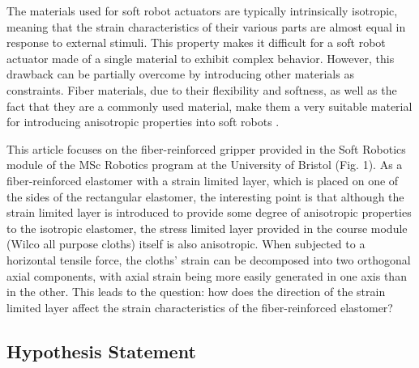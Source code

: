 \documentclass[conference]{IEEEtran}
\begin{document}
The materials used for soft robot actuators are typically intrinsically isotropic, meaning that the strain characteristics of their various parts are almost equal in response to external stimuli. This property makes it difficult for a soft robot actuator made of a single material to exhibit complex behavior. However, this drawback can be partially overcome by introducing other materials as constraints. Fiber materials, due to their flexibility and softness, as well as the fact that they are a commonly used material, make them a very suitable material for introducing anisotropic properties into soft robots \cite{overview}.



This article focuses on the fiber-reinforced gripper provided in the Soft Robotics module of the MSc Robotics program at the University of Bristol (Fig. 1). As a fiber-reinforced elastomer with a strain limited layer\cite{stress_constraint_layer}, which is placed on one of the sides of the rectangular elastomer, the interesting point is that although the strain limited layer is introduced to provide some degree of anisotropic properties to the isotropic elastomer, the stress limited layer provided in the course module  (Wilco all purpose cloths) itself is also anisotropic. When subjected to a horizontal tensile force, the cloths' strain can be decomposed into two orthogonal axial components, with axial strain being more easily generated in one axis than in the other. This leads to the question: how does the direction of the strain limited layer affect the strain characteristics of the fiber-reinforced elastomer?





\subsection{Hypothesis Statement}

\end{document}
